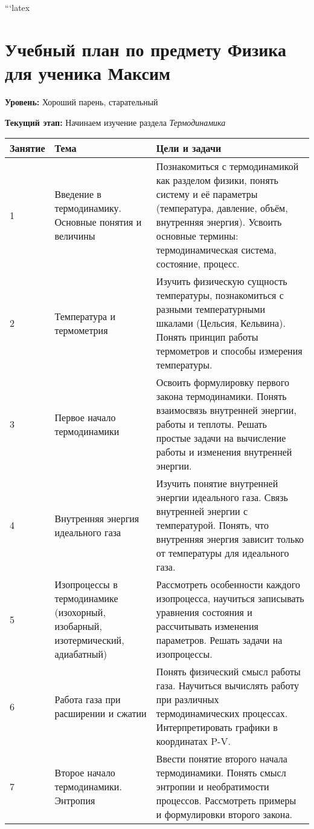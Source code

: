 \documentclass{article}
\begin{document}
```latex
\section*{Учебный план по предмету \textbf{Физика} для ученика Максим}

\textbf{Уровень:} Хороший парень, старательный

\textbf{Текущий этап:} Начинаем изучение раздела \textit{Термодинамика}

\vspace{0.5cm}

\begin{tabular}{|p{3cm}|p{7cm}|p{5cm}|}
\hline
\textbf{Занятие} & \textbf{Тема} & \textbf{Цели и задачи} \\
\hline
1 & Введение в термодинамику. Основные понятия и величины & Познакомиться с термодинамикой как разделом физики, понять систему и её параметры (температура, давление, объём, внутренняя энергия). Усвоить основные термины: термодинамическая система, состояние, процесс. \\
\hline
2 & Температура и термометрия & Изучить физическую сущность температуры, познакомиться с разными температурными шкалами (Цельсия, Кельвина). Понять принцип работы термометров и способы измерения температуры. \\
\hline
3 & Первое начало термодинамики & Освоить формулировку первого закона термодинамики. Понять взаимосвязь внутренней энергии, работы и теплоты. Решать простые задачи на вычисление работы и изменения внутренней энергии. \\
\hline
4 & Внутренняя энергия идеального газа & Изучить понятие внутренней энергии идеального газа. Связь внутренней энергии с температурой. Понять, что внутренняя энергия зависит только от температуры для идеального газа. \\
\hline
5 & Изопроцессы в термодинамике (изохорный, изобарный, изотермический, адиабатный) & Рассмотреть особенности каждого изопроцесса, научиться записывать уравнения состояния и рассчитывать изменения параметров. Решать задачи на изопроцессы. \\
\hline
6 & Работа газа при расширении и сжатии & Понять физический смысл работы газа. Научиться вычислять работу при различных термодинамических процессах. Интерпретировать графики в координатах P-V. \\
\hline
7 & Второе начало термодинамики. Энтропия & Ввести понятие второго начала термодинамики. Понять смысл энтропии и необратимости процессов. Рассмотреть примеры и формулировки второго закона. \\

\end{tabular}
\end{document}
